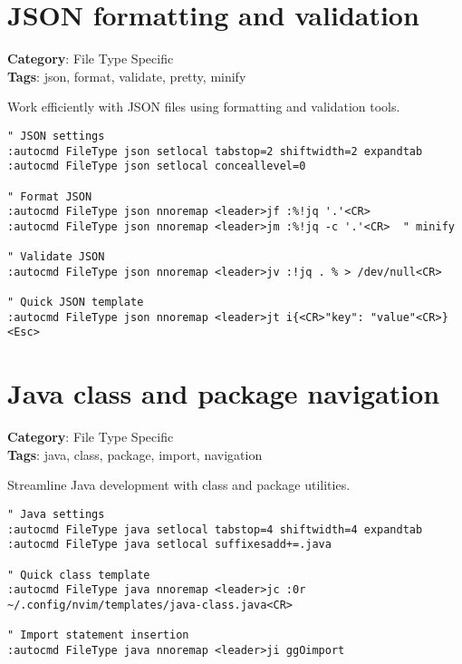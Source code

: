 {{{{{\section{JSON formatting and validation}

\textbf{Category}: File Type Specific\\ \textbf{Tags}: json, format, validate, pretty, minify
\vspace{0.5cm}

Work efficiently with JSON files using formatting and validation tools.

\begin{Exa*}{}
\begin{Verbatim}[fontsize=\footnotesize, breaklines, breakanywhere]
" JSON settings
:autocmd FileType json setlocal tabstop=2 shiftwidth=2 expandtab
:autocmd FileType json setlocal conceallevel=0

" Format JSON
:autocmd FileType json nnoremap <leader>jf :%!jq '.'<CR>
:autocmd FileType json nnoremap <leader>jm :%!jq -c '.'<CR>  " minify

" Validate JSON
:autocmd FileType json nnoremap <leader>jv :!jq . % > /dev/null<CR>

" Quick JSON template
:autocmd FileType json nnoremap <leader>jt i{<CR>"key": "value"<CR>}<Esc>
\end{Verbatim}
\end{Exa*}

\section{Java class and package navigation}

\textbf{Category}: File Type Specific\\ \textbf{Tags}: java, class, package, import, navigation
\vspace{0.5cm}

Streamline Java development with class and package utilities.

\begin{Exa*}{}
\begin{Verbatim}[fontsize=\footnotesize, breaklines, breakanywhere]
" Java settings
:autocmd FileType java setlocal tabstop=4 shiftwidth=4 expandtab
:autocmd FileType java setlocal suffixesadd+=.java

" Quick class template
:autocmd FileType java nnoremap <leader>jc :0r ~/.config/nvim/templates/java-class.java<CR>

" Import statement insertion
:autocmd FileType java nnoremap <leader>ji ggOimport 


\end{Verbatim}
\end{Exa*}}}}}}
